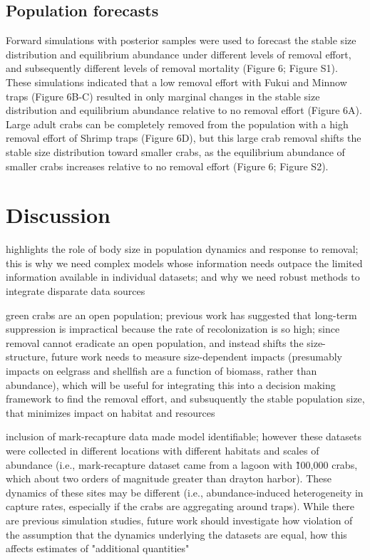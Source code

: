 \documentclass{article}
\begin{document}
\subsection{Population forecasts}

Forward simulations with posterior samples were used to forecast the stable size distribution and equilibrium abundance under different levels of removal effort, and subsequently different levels of removal mortality (Figure 6; Figure S1). These simulations indicated that a low removal effort with Fukui and Minnow traps (Figure 6B-C) resulted in only marginal changes in the stable size distribution and equilibrium abundance relative to no removal effort (Figure 6A). Large adult crabs can be completely removed from the population with a high removal effort of Shrimp traps (Figure 6D), but this large crab removal shifts the stable size distribution toward smaller crabs, as the equilibrium abundance of smaller crabs increases relative to no removal effort (Figure 6; Figure S2).

\section{Discussion}

highlights the role of body size in population dynamics and response to removal; this is why we need complex models whose information needs outpace the limited information available in individual datasets; and why we need robust methods to integrate disparate data sources

green crabs are an open population; previous work has suggested that long-term suppression is impractical because the rate of recolonization is so high; since removal cannot eradicate an open population, and instead shifts the size-structure, future work needs to measure size-dependent impacts (presumably impacts on eelgrass and shellfish are a function of biomass, rather than abundance), which will be useful for integrating this into a decision making framework to find the removal effort, and subsuquently the stable population size, that minimizes impact on habitat and resources

inclusion of mark-recapture data made model identifiable; however these datasets were collected in different locations with different habitats and scales of abundance (i.e., mark-recapture dataset came from a lagoon with \~100,000 crabs, which about two orders of magnitude greater than drayton harbor). These dynamics of these sites may be different 
(i.e., abundance-induced heterogeneity in capture rates, especially if the crabs are aggregating around traps). While there are previous simulation studies, future work should investigate how violation of the assumption that the dynamics underlying the datasets are equal, how this affects estimates of "additional quantities"
\end{document}
